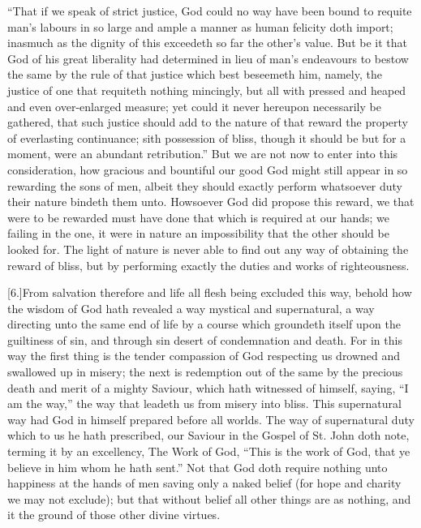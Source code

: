 “That if we speak of strict justice, God could no way have been bound to requite man’s labours in so large and ample a manner as human felicity doth import; inasmuch as the dignity of this exceedeth so far the other’s value. But be it that God of his great liberality had determined in lieu of man’s endeavours to bestow the same by the rule of that justice which best beseemeth him, namely, the justice of one that requiteth nothing mincingly, but all with pressed and heaped and even over-enlarged measure; yet could it never hereupon necessarily be gathered, that such justice should add to the nature of that reward the property of everlasting continuance; sith possession of bliss, though it should be but for a moment, were an abundant retribution.” But we are not now to enter into this consideration, how gracious and bountiful our good God might still appear in so rewarding the sons of men, albeit they should exactly perform whatsoever duty their nature bindeth them unto. Howsoever God did propose this reward, we that were to be rewarded must have done that which is required at our hands; we failing in the one, it were in nature an impossibility that the other should be looked for. The light of nature is never able to find out any way of obtaining the reward of bliss, but by performing exactly the duties and works of righteousness.

[6.]From salvation therefore and life all flesh being  excluded this way, behold how the wisdom of God hath revealed a way mystical and supernatural, a way directing unto the same end of life by a course which groundeth itself upon the guiltiness of sin, and through sin desert of condemnation and death. For in this way the first thing is the tender compassion of God respecting us drowned and swallowed up in misery; the next is redemption out of the same by the precious death and merit of a mighty Saviour, which hath witnessed of himself, saying, “I am the way,” the way that leadeth us from misery into bliss. This supernatural way had God in himself prepared before all worlds. The way of supernatural duty which to us he hath prescribed, our Saviour in the Gospel of St. John doth note, terming it by an excellency, The Work of God, “This is the work of God, that ye believe in him whom he hath sent.” Not that God doth require nothing unto happiness at the hands of men saving only a naked belief (for hope and charity we may not exclude); but that without belief all other things are as nothing, and it the ground of those other divine virtues.

